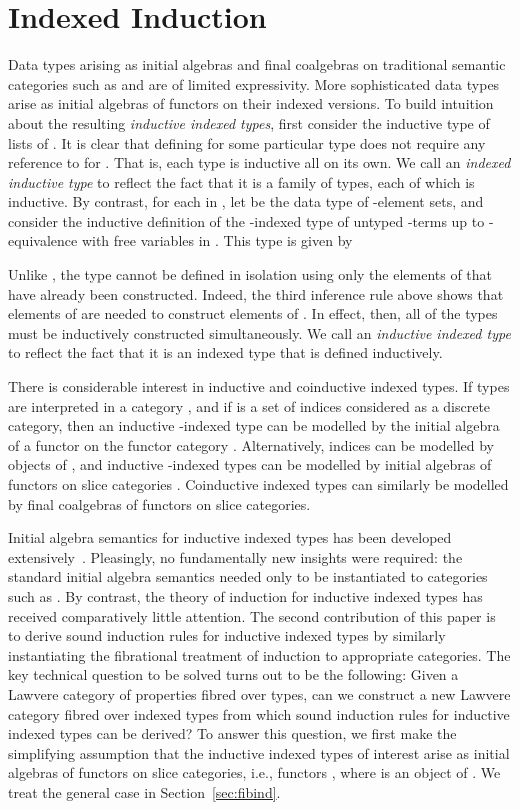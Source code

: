 \documentclass{LMCS}
\theoremstyle{plain}
\theoremstyle{remark}
\theoremstyle{definition}
\begin{document}
\section{Indexed Induction}\label{sec:indind}

Data types arising as initial algebras and final coalgebras on
traditional semantic categories such as  and 
are of limited expressivity. More sophisticated data types arise as
initial algebras of functors on their indexed versions. To build
intuition about the resulting {\em inductive indexed types}, first
consider the inductive type  of lists of . It is
clear that defining  for some particular type 
does not require any reference to  for . That is, each type  is inductive all on its
own. We call  an {\em indexed inductive type} to
reflect the fact that it is a family of types, each of which is
inductive. By contrast, for each  in , let 
be the data type of -element sets, and consider the inductive
definition of the -indexed type  of
untyped -terms up to -equivalence with free variables
in . This type is given by

Unlike , the type  cannot be defined in
isolation using only the elements of  that have already been
constructed. Indeed, the third inference rule above shows that
elements of  are needed to construct elements of . In effect, then, all of the types  must be inductively
constructed simultaneously. We call  an {\em inductive indexed
  type} to reflect the fact that it is an indexed type that is defined
inductively.

There is considerable interest in inductive and coinductive indexed
types. If types are interpreted in a category , and if  is a
set of indices considered as a discrete category, then an inductive
-indexed type can be modelled by the initial algebra of a functor
on the functor category . Alternatively, indices can be
modelled by objects of , and inductive -indexed types can be
modelled by initial algebras of functors on slice categories
. Coinductive indexed types can similarly be modelled by final
coalgebras of functors on slice categories.

Initial algebra semantics for inductive indexed types has been
developed extensively~\cite{dyb94,ma09}. Pleasingly, no fundamentally
new insights were required: the standard initial algebra semantics
needed only to be instantiated to categories such as . By
contrast, the theory of induction for inductive indexed types has
received comparatively little attention. The second contribution of
this paper is to derive sound induction rules for inductive indexed
types by similarly instantiating the fibrational treatment of
induction to appropriate categories.  The key technical question to be
solved turns out to be the following: Given a Lawvere category of
properties fibred over types, can we construct a new Lawvere category
fibred over indexed types from which sound induction rules for
inductive indexed types can be derived? To answer this question, we
first make the simplifying assumption that the inductive indexed types
of interest arise as initial algebras of functors on slice categories,
i.e., functors , where  is an object of . We
treat the general case in Section~\ref{sec:fibind}.
\end{document}
